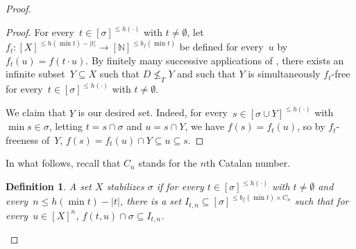 \documentclass[10pt,a4paper]{article}
\newcommand{\NN}[0]{\mathbb{N}}
\numberwithin{theorem}{section}
\newtheorem{lemma}[theorem]{Lemma}
\newtheorem{definition}[theorem]{Definition}
\begin{document}
\begin{proof}
\begin{proof}
For every~$t \in [\sigma]^{\leq h(\cdot)}$ with $t \neq \emptyset$, let $f_t : [X]^{\leq h(\min t) - |t|} \to [\NN]^{\leq b_f(\min t)}$ be defined for every~$u$ by $f_t(u) = f(t \cdot u)$.
By finitely many successive applications of ,
there exists an infinite subset~$Y \subseteq X$ such that $D \not \leq_T Y$
and such that $Y$ is simultaneously $f_t$-free for every~$t \in [\sigma]^{\leq h(\cdot)}$ with $t \neq \emptyset$.

We claim that $Y$ is our desired set. Indeed, for every~$s \in [\sigma \cup Y]^{\leq h(\cdot)}$ with $\min s \in \sigma$, letting $t = s \cap \sigma$ and $u = s \cap Y$, we have $f(s) = f_t(u)$, so by $f_t$-freeness of~$Y$, $f(s) = f_t(u) \cap Y \subseteq u \subseteq s$.
\end{proof}

In what follows, recall that $C_n$ stands for the $n$th Catalan number.

\begin{definition}
A set $X$ \emph{stabilizes} $\sigma$ if for every $t \in [\sigma]^{\leq h(\cdot)}$ with $t \neq \emptyset$ and every~$n \leq h(\min t) - |t|$,
there is a set $I_{t,n} \subseteq [\sigma]^{\leq b_f(\min t) \times C_n}$ such that for every~$u \in [X]^n$,
$f(t, u) \cap \sigma \subseteq I_{t, n}$.
\end{definition}


\end{proof}
\end{document}
